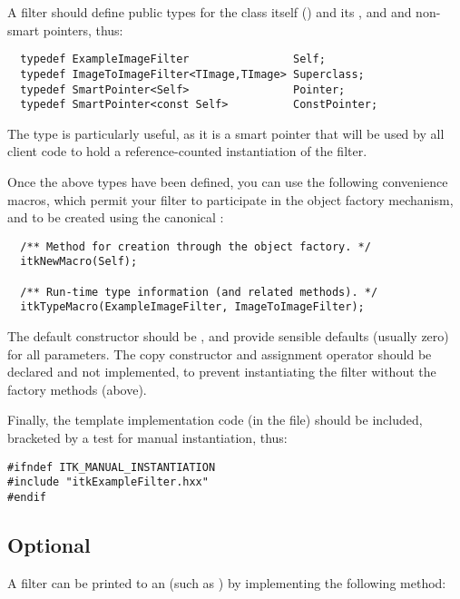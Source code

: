 A filter should define public types for the class itself () and
its , and  and non- smart pointers,
thus:

\begin{verbatim}
  typedef ExampleImageFilter                Self;
  typedef ImageToImageFilter<TImage,TImage> Superclass;
  typedef SmartPointer<Self>                Pointer;
  typedef SmartPointer<const Self>          ConstPointer;
\end{verbatim}

The  type is particularly useful, as it is a smart pointer
that will be used by all client code to hold a reference-counted
instantiation of the filter. 

Once the above types have been defined, you can use the following
convenience macros, which permit your filter to participate in the object
factory mechanism, and to be created using the canonical :

\begin{verbatim}
  /** Method for creation through the object factory. */
  itkNewMacro(Self);  

  /** Run-time type information (and related methods). */
  itkTypeMacro(ExampleImageFilter, ImageToImageFilter);
\end{verbatim}

The default constructor should be , and provide sensible
defaults (usually zero) for all parameters.  The copy constructor and
assignment operator should be declared  and not implemented,
to prevent instantiating the filter without the factory methods (above). 

Finally, the template implementation code (in the  file) should
be included, bracketed by a test for manual instantiation, thus:

\begin{verbatim}
#ifndef ITK_MANUAL_INSTANTIATION
#include "itkExampleFilter.hxx"
#endif
\end{verbatim}

\subsection{Optional}
\label{sec:FilterPrinting}

A filter can be printed to an  (such as )
by implementing the following method:

